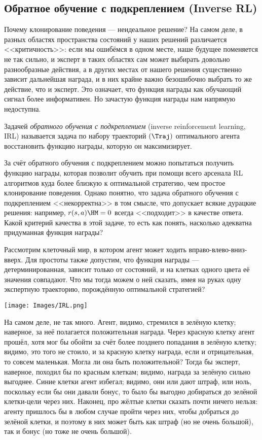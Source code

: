 \subsection{Обратное обучение с подкреплением (Inverse RL)}\label{subsec_irl}

Почему клонирование поведения --- неидеальное решение? На самом деле, в разных областях пространства состояний у наших решений различается <<критичность>>: если мы ошибёмся в одном месте, наше будущее поменяется не так сильно, и эксперт в таких областях сам может выбирать довольно разнообразные действия, а в других местах от нашего решения существенно зависит дальнейшая награда, и в них крайне важно безошибочно выбрать то же действие, что и эксперт. Это означает, что функция награды как обучающий сигнал более информативен. Но зачастую функция награды нам напрямую недоступна. 

\begin{definition}
Задачей \emph{обратного обучения с подкреплением} (inverse reinforcement learning, IRL) называется задача по набору траекторий $(\Traj)$ оптимального агента восстановить функцию награды, которую он максимизирует.
\end{definition}

За счёт обратного обучения с подкреплением можно попытаться получить функцию награды, которая позволит обучить при помощи всего арсенала RL алгоритмов куда более близкую к оптимальной стратегию, чем простое клонирование поведения. Однако понятно, что задача обратного обучения с подкреплением <<некорректна>> в том смысле, что допускает всякие дурацкие решения: например, $r(s, a) \HM= 0$ всегда <<подходит>> в качестве ответа. Какой критерий качества в этой задаче, то есть как понять, насколько адекватна придуманная функция награды?

\begin{example}
Рассмотрим клеточный мир, в котором агент может ходить вправо-влево-вниз-вверх. Для простоты также допустим, что функция награды --- детерминированная, зависит только от состояний, и на клетках одного цвета её значения совпадают. Что мы тогда можем о ней сказать, имея на руках одну экспертную траекторию, порождённую оптимальной стратегией?
\begin{center}
    \texttt{[image: Images/IRL.png]}
\end{center}
На самом деле, не так много. Агент, видимо, стремился в зелёную клетку; наверное, за неё полагается положительная награда. Через красную клетку агент прошёл, хотя мог бы обойти за счёт более позднего попадания в зелёную клетку; видимо, это того не стоило, и за красную клетку награда, если и отрицательная, то совсем маленькая. Могла ли она быть положительной? Тогда бы эксперт, наверное, походил бы по красным клеткам; видимо, награда за зелёную сильно выгоднее. Синие клетки агент избегал; видимо, они или дают штраф, или ноль, поскольку если бы они давали бонус, то было бы выгодно добираться до зелёной клетки-цели через них. Наконец, про жёлтые клетки сказать почти ничего нельзя: агенту пришлось бы в любом случае пройти через них, чтобы добраться до зелёной клетки, и поэтому в них может быть как штраф (но не очень большой), так и бонус (но тоже не очень большой).
\end{example}

